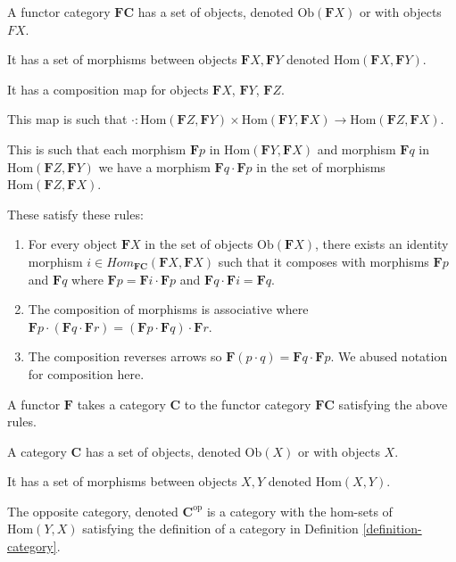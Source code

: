 \begin{definition}
	\label{definition-contravariant-functor}
	A functor category $\mathbf{FC}$ has a set of objects, denoted $\mathrm{Ob}(\mathbf{F}X)$ or with objects $FX$.
	
	It has a set of morphisms between objects $\mathbf{F}X, \mathbf{F}Y$ denoted $\mathrm{Hom}(\mathbf{F}X,\mathbf{F}Y)$. 
	
	It has a composition map for objects $\mathbf{F}X$, $\mathbf{F}Y$, $\mathbf{F}Z$.
	
	This map is such that $\cdot: \mathrm{Hom}(\mathbf{F}Z, \mathbf{F}Y) \times \mathrm{Hom}(\mathbf{F}Y,\mathbf{F}X) \rightarrow \mathrm{Hom}(\mathbf{F}Z, \mathbf{F}X)$.
	
	This is such that each morphism $\mathbf{F}p$ in $\mathrm{Hom}(\mathbf{F}Y,\mathbf{F}X)$ and morphism $\mathbf{F}q$ in $\mathrm{Hom}(\mathbf{F}Z, \mathbf{F}Y)$ we have a morphism $\mathbf{F}q \cdot \mathbf{F}p$ in the set of morphisms $\mathrm{Hom}(\mathbf{F}Z, \mathbf{F}X)$.

	These satisfy these rules:

	\begin{enumerate}
		\item For every object $\mathbf{F}X$ in the set of objects $\mathrm{Ob}(\mathbf{F}X)$, there exists an identity morphism $i \in Hom_\mathbf{FC}(\mathbf{F}X, \mathbf{F}X)$ such that it composes with morphisms $\mathbf{F}p$ and $\mathbf{F}q$ where $\mathbf{F}p = \mathbf{F}i \cdot \mathbf{F}p$ and $\mathbf{F}q \cdot \mathbf{F}i = \mathbf{F}q$.
		\item The composition of morphisms is associative where $\mathbf{F}p \cdot ( \mathbf{F}q \cdot \mathbf{F}r) = (\mathbf{F}p \cdot \mathbf{F}q) \cdot \mathbf{F}r$.
		\item The composition reverses arrows so $\mathbf{F}(p \cdot q) = \mathbf{F}q \cdot \mathbf{F}p$. We abused notation for composition here.
	\end{enumerate}

	A functor $\mathbf{F}$ takes a category $\mathbf{C}$ to the functor category $\mathbf{FC}$ satisfying the above rules.
\end{definition}

\begin{definition}
	\label{definition-op-category}
	A category $\mathbf{C}$ has a set of objects, denoted $\mathrm{Ob}(X)$ or with objects $X$.
	
	It has a set of morphisms between objects $X, Y$ denoted $\mathrm{Hom}(X,Y)$. 
	
	The opposite category, denoted $\mathbf{C}^\mathrm{op}$ is a category with the hom-sets of $\mathrm{Hom}(Y,X)$ satisfying the definition of a category in Definition \ref{definition-category}.
\end{definition}